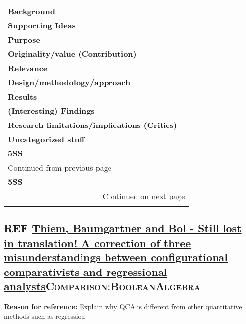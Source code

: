 \documentclass[11pt]{article}
\begin{document}
\begin{longtable}{l|p{}}
\hline
\hline
\textbf{Background} & \\
\textbf{Supporting Ideas} & \\
\textbf{Purpose} & \\
\textbf{Originality/value (Contribution)} & \\
\textbf{Relevance} & \\
\textbf{Design/methodology/approach} & \\
\textbf{Results} & \\
\textbf{(Interesting) Findings} & \\
\textbf{Research limitations/implications (Critics)} & \\
\textbf{Uncategorized stuff} & \\
\textbf{5SS} & \\
\hline
\endfirsthead
\multicolumn{2}{l}{Continued from previous page} \\

\textbf{5SS} &  \\

\hline
\endhead
\hline\multicolumn{2}{r}{Continued on next page} \\
\endfoot
\endlastfoot
\hline
\hline
\end{longtable}


\subsection*{{\bfseries\sffamily REF} \href{https://doi.org/10.1177\%2F0010414014565892}{Thiem, Baumgartner and Bol - Still lost in translation! A correction of three misunderstandings between configurational comparativists and regressional analysts}\hfill{}\textsc{Comparison:BooleanAlgebra}}
\label{sec:org75e0f03}
\textbf{Reason for reference:} Explain why QCA is different from other quantitative methods such as regression
\end{document}
